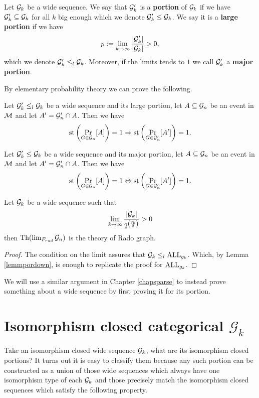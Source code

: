 \begin{defi}\label{defiportion}
Let $\mathcal{G}_k$ be a wide sequence. We say that $\mathcal{G}_k'$ is a \textbf{portion} of $\mathcal{G}_k$ if we have $\mathcal{G}_k'\subseteq \mathcal{G}_k$ for all $k$ big enough which we denote $\mathcal{G}_k'\leq \mathcal{G}_k$. We say it is a \textbf{large portion} if we have
\[p:=\lim_{k\to\infty}\frac{\left|{\mathcal{G}_k'}\right|}{\left|{\mathcal{G}_k}\right|}>0,\]
which we denote $\mathcal{G}_k' \leq_l \mathcal{G}_k$. Moreover, if the limits tends to $1$ we call $\mathcal{G}_k'$ a \textbf{major portion}.
\end{defi}

By elementary probability theory we can prove the following.

\begin{lemm}\label{lemmpordown}
Let $\mathcal{G}_k'\leq_l \mathcal{G}_k$ be a wide sequence and its large portion, let $A\subseteq \mathcal{G}_n$ be an event in $\mathcal{M}$ and let $A'=\mathcal{G}_n'\cap A$. Then we have
\[\text{st}\left(\Pr_{G\in\mathcal{G}_n}[A]\right)=1 \Rightarrow \text{st}\left(\Pr_{G\in\mathcal{G}_n'}[A']\right)=1.\]
\end{lemm}

\begin{lemm}\label{lemmporup}
Let $\mathcal{G}_k'\leq \mathcal{G}_k$ be a wide sequence and its major portion, let $A\subseteq \mathcal{G}_n$ be an event in $\mathcal{M}$ and let $A'=\mathcal{G}_n'\cap A$. Then we have
\[\text{st}\left(\Pr_{G\in\mathcal{G}_n}[A]\right)=1 \Leftrightarrow \text{st}\left(\Pr_{G\in\mathcal{G}_n'}[A']\right)=1.\]
\end{lemm}


\begin{crll}\label{crlltoobig}
Let $\mathcal{G}_k$ be a wide sequence such that 
\[\lim_{k\to\infty}\frac{\left|{\mathcal{G}_k}\right|}{2^{\binom{g_k}{2}}}>0\] then $\text{Th}(\lim_{F_{rud}}\mathcal{G}_n)$ is the theory of Rado graph.
\end{crll}
\begin{proof}
The condition on the limit assures that $\mathcal{G}_k\leq_l \text{ALL}_{g_k}$. Which, by Lemma \ref{lemmpordown}, is enough to replicate the proof for $\text{ALL}_{g_k}$.
\end{proof}

We will use a similar argument in Chapter \ref{chapsparse} to instead prove something about a wide sequence by first proving it for its portion.

\section{Isomorphism closed categorical \texorpdfstring{$\mathcal{G}_k$}{Gk}}

Take an isomorphism closed wide sequence $\mathcal{G}_k$, what are its isomorphism closed portions? It turns out it is easy to classify them because any such portion can be constructed as a union of those wide sequences which always have one isomorphism type of each $\mathcal{G}_k$ and those precisely match the isomorphism closed sequences which satisfy the following property.

